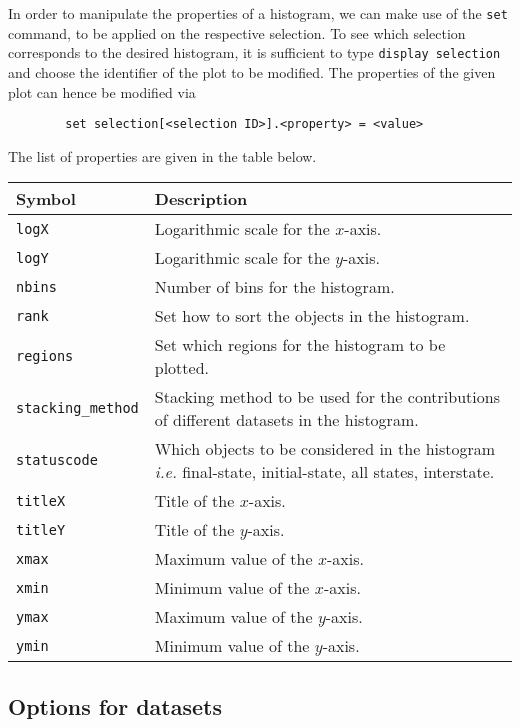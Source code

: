 \documentclass[a4paper]{article}
\begin{document}
In order to manipulate the properties of a histogram, we can make use of the \texttt{set} command, to be applied on the respective selection. To see which selection corresponds to the desired histogram, it is sufficient to type \texttt{display selection} and choose the identifier of the plot to be modified. The properties of the given plot can hence be modified via
{\color{ao} \begin{verbatim}
		set selection[<selection ID>].<property> = <value>
\end{verbatim}}
\noindent The list of properties are given in the table below.

\renewcommand{\arraystretch}{1.2}%
\begin{center}\begin{tabular}{l p{9.4cm}}
		\hline
		Symbol& Description\\
		\hline
		\color{ao} \verb?logX?     & Logarithmic scale for the $x$-axis.\\
		\color{ao} \verb?logY?    & Logarithmic scale for the $y$-axis.\\
		\color{ao} \verb?nbins?   & Number of bins for the histogram.\\
		\color{ao} \verb?rank?     & Set how to sort the objects in the histogram.		\\
		\color{ao} \verb?regions?    & Set which regions for the histogram to be plotted.\\
		\color{ao} \verb?stacking_method?    &  Stacking method to be used for the contributions of different datasets in the histogram.\\
		\color{ao} \verb?statuscode?    & Which objects to be considered in the histogram {\it i.e.} final-state, initial-state, all states, interstate.\\
		\color{ao} \verb?titleX?    & Title of the $x$-axis.\\
		\color{ao} \verb?titleY?      & Title of the $y$-axis.\\
		\color{ao} \verb?xmax?    & Maximum value of the $x$-axis.\\
		\color{ao} \verb?xmin?  & Minimum value of the $x$-axis.\\
		\color{ao} \verb?ymax?    & Maximum value of the $y$-axis.\\
		\color{ao} \verb?ymin?          & Minimum value of the $y$-axis.\\\hline
	\end{tabular}
\end{center}

\vspace{2cm}
\begin{shaded}
\section{\Large Options for datasets}
\label{sec:datasets}
\end{shaded}
\end{document}
